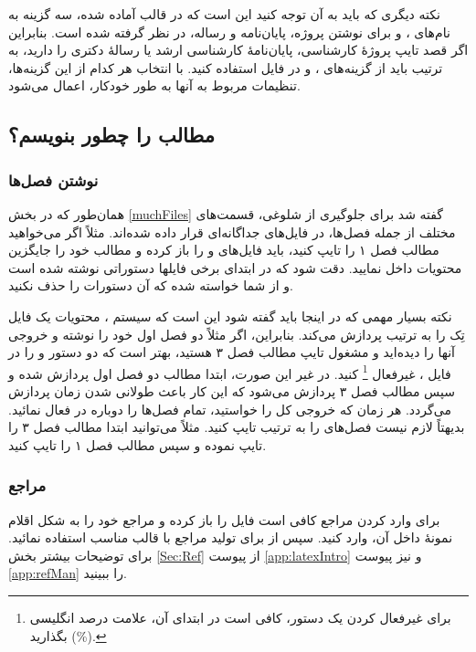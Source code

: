نکته دیگری که باید به آن توجه کنید این است که در قالب آماده شده، سه گزینه به نام‌های
،
و
برای نوشتن پروژه، پایان‌نامه و رساله، در نظر گرفته شده است. بنابراین اگر قصد تایپ پروژهٔ کارشناسی، پایان‌نامهٔ کارشناسی ارشد یا رسالهٔ دکتری را دارید، به ترتیب باید از گزینه‌های
،
و
در فایل 
استفاده کنید. با انتخاب هر کدام از این گزینه‌ها، تنظیمات مربوط به آنها به طور خودکار، اعمال می‌شود.


\subsection[مطالب پایان‌نامه را چطور بنویسم؟]
{مطالب \پ را چطور بنویسم؟}
\subsubsection{نوشتن فصل‌ها}
همان‌طور که در بخش \ref{muchFiles} گفته شد برای جلوگیری از شلوغی، قسمت‌های مختلف \پ از جمله فصل‌ها، در فایل‌های جداگانه‌ای قرار داده شده‌اند. 
مثلاً اگر می‌خواهید مطالب فصل ۱ را تایپ کنید، باید فایل‌های 
و
را باز کرده و مطالب خود را جایگزین محتویات داخل 
نمایید. دقت شود که در ابتدای برخی فایلها دستوراتی نوشته شده است و از شما خواسته شده که آن دستورات را حذف نکنید.


نکته بسیار مهمی که در اینجا باید گفته شود این است که سیستم \lr{\TeX}، محتویات یک فایل تِک را به ترتیب پردازش می‌کند.  بنابراین، اگر مثلاً  دو فصل اول خود را نوشته و خروجی آنها را دیده‌اید و مشغول تایپ مطالب فصل ۳ هستید، بهتر است
که دو دستور 
\verb!!
و
\verb!!
را در فایل 
،
غیرفعال%
\footnote{
برای غیرفعال کردن یک دستور، کافی است در ابتدای آن، علامت درصد انگلیسی (\%) بگذارید.
}
 کنید. در غیر این صورت، ابتدا مطالب دو فصل اول پردازش شده و سپس مطالب فصل ۳ پردازش می‌شود که این کار باعث طولانی شدن زمان پردازش می‌گردد. هر زمان که خروجی کل \پ را خواستید، تمام فصل‌ها را دوباره در
فعال نمائید.
بدیهتاً لازم نیست فصل‌های \پ را به ترتیب تایپ کنید. مثلاً می‌توانید ابتدا مطالب فصل ۳ را تایپ نموده و سپس مطالب فصل ۱ را تایپ کنید. 
\subsubsection{مراجع}
برای وارد کردن مراجع \پ کافی است فایل 
را باز کرده و مراجع خود را به شکل اقلام نمونهٔ داخل آن، وارد کنید.  سپس از  برای تولید مراجع با قالب مناسب استفاده نمائید. برای توضیحات بیشتر بخش \ref{Sec:Ref} از پیوست \ref{app:latexIntro} و نیز پیوست \ref{app:refMan} را ببینید.

